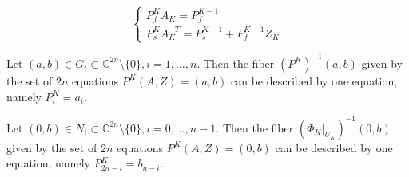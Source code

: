 \documentclass[10pt,a4paper]{amsart}
\begin{document}
\begin{equation}\label{equa-2}
    \begin{cases}
    P^K_f A_K = P^{K-1}_{f} \\
      P^K_s A^{-T}_K = P^{K-1}_s + P^{K-1}_f Z_K 
\end{cases}
\end{equation}

\begin{lemm}\label{red-1}
Let $(a,b)\in G_i \subset \mathbb{C}^{2n}\setminus \{0\}, i = 1, \dots, n$. Then the fiber $(P^K)^{-1}(a,b)$ given by the set of $2n$ equations $P^K(A,Z) = (a, b)$ can be described by one equation, namely $P^K_i = a_i$.
\end{lemm}

\begin{lemm}\label{red-2}
     Let $(0,b)\in N_i \subset \mathbb{C}^{2n}\setminus \{0\}, i = 0, \dots, n-1$. Then the fiber $(\Phi_K|_{U_K})^{-1}(0,b)$ given by the set of $2n$ equations $P^K(A,Z)=(0,b)$ can be described by one equation, namely $P^K_{2n-i}=b_{n-i}$.
\end{lemm}
\end{document}
